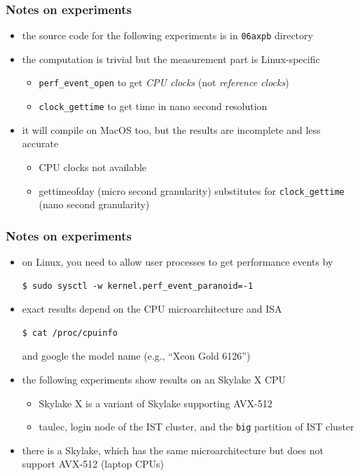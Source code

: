 \documentclass[12pt,dvipdfmx]{beamer}
\newcommand{\ao}[1]{{\color{blue}#1}}
\newcommand{\aka}[1]{{\color{red}#1}}
\begin{document}
\iffalse
\begin{frame}[fragile]
\frametitle{Notes on experiments}
\begin{itemize}
\item the source code for the following experiments is
  in \ao{\tt 06axpb} directory

\item the computation is trivial but the measurement part
  is Linux-specific
  \begin{itemize}
  \item {\tt perf\_event\_open} to get \ao{\it CPU clocks}
      (not \aka{\it reference clocks})
  \item {\tt clock\_gettime} to get time in nano second resolution
  \end{itemize}

\item it will compile on MacOS too, but the results
  are incomplete and less accurate
  \begin{itemize}
  \item CPU clocks not available
  \item gettimeofday (micro second granularity) substitutes
    for {\tt clock\_gettime} (nano second granularity)
  \end{itemize}
\end{itemize}
\end{frame}

\begin{frame}[fragile]
\frametitle{Notes on experiments}
\begin{itemize}
\item on Linux, you need to allow user processes to
  get performance events by

\begin{lstlisting}
$ sudo sysctl -w kernel.perf_event_paranoid=-1
\end{lstlisting} %

\item exact results depend on the CPU microarchitecture and ISA

\begin{lstlisting}
$ cat /proc/cpuinfo    
\end{lstlisting} %
and google the model name (e.g., ``Xeon Gold 6126'')

\item the following experiments show results 
  on an \ao{Skylake X} CPU
  \begin{itemize}
  \item Skylake X is a variant of Skylake supporting AVX-512
  \item taulec, login node of the IST cluster, and the {\tt big} partition of IST cluster
  \end{itemize}

\item there is a \ao{Skylake},
  which has the same microarchitecture
  but does not support AVX-512 (laptop CPUs)
\end{itemize}
\end{frame}
\end{document}
